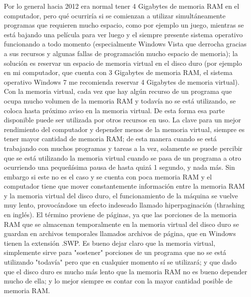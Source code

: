 \documentclass{article}
\begin{document}
Por lo general hacia 2012 era normal tener 4 Gigabytes de memoria RAM en el computador,
pero qué ocurriría si se comienzan a utilizar simultáneamente programas que requieren mucho
espacio, como por ejemplo un juego, mientras se está bajando una película para ver luego y el
siempre presente sistema operativo funcionando a todo momento (especialmente Windows
Vista que derrocha gracias a sus recursos y algunas fallas de programación mucho espacio de
memoria); la solución es reservar un espacio de memoria virtual en el disco duro (por ejemplo
en mi computador, que cuenta con 3 Gigabytes de memoria RAM, el sistema operativo Windows
7 me recomienda reservar 4 Gigabytes de memoria virtual). Con la memoria virtual, cada vez
que hay algún recurso de un programa que ocupa mucho volumen de la memoria RAM y todavía
no se está utilizando, se coloca hasta próximo aviso en la memoria virtual. De esta forma esa
parte disponible puede ser utilizada por otros recursos en uso.
La clave para un mejor rendimiento del computador y depender menos de la memoria virtual,
siempre es tener mayor cantidad de memoria RAM; de esta manera cuando se está trabajando
con muchos programas y tareas a la vez, solamente se puede percibir que se está utilizando la
memoria virtual cuando se pasa de un programa a otro ocurriendo una pequeñísima pausa de
hasta quizá 1 segundo, y nada más. Sin embargo si este no es el caso y se cuenta con poca
memoria RAM y el computador tiene que mover constantemente información entre la memoria
RAM y la memoria virtual del disco duro, el funcionamiento de la máquina se vuelve muy lento,
provocándose un efecto indeseado llamado hiperpaginación (thrashing en inglés). El término
proviene de páginas, ya que las porciones de la memoria RAM que se almacenan temporalmente
en la memoria virtual del disco duro se guardan en archivos temporales llamados archivos de
página, que en Windows tienen la extensión .SWP.
Es bueno dejar claro que la memoria virtual, simplemente sirve para "sostener" porciones de
un programa que no se está utilizando "todavía" pero que en cualquier momento sí se
utilizará; y que dado que el disco duro es mucho más lento que la memoria RAM no es bueno
depender mucho de ella; y lo mejor siempre es contar con la mayor cantidad posible de
memoria RAM.
\end{document}
